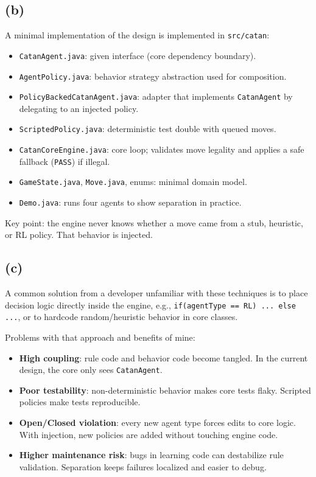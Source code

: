 \subsection{(b)}
A minimal implementation of the design is implemented in \texttt{src/catan}:
\begin{itemize}
    \item \texttt{CatanAgent.java}: given interface (core dependency boundary).
    \item \texttt{AgentPolicy.java}: behavior strategy abstraction used for composition.
    \item \texttt{PolicyBackedCatanAgent.java}: adapter that implements \texttt{CatanAgent} by delegating to an injected policy.
    \item \texttt{ScriptedPolicy.java}: deterministic test double with queued moves.
    \item \texttt{CatanCoreEngine.java}: core loop; validates move legality and applies a safe fallback (\texttt{PASS}) if illegal.
    \item \texttt{GameState.java}, \texttt{Move.java}, enums: minimal domain model.
    \item \texttt{Demo.java}: runs four agents to show separation in practice.
\end{itemize}

Key point: the engine never knows whether a move came from a stub, heuristic, or RL policy. That behavior is injected.

\subsection{(c)}
A common solution from a developer unfamiliar with these techniques is to place decision logic directly inside the engine, e.g., \texttt{if(agentType == RL) ... else ...}, or to hardcode random/heuristic behavior in core classes.

Problems with that approach and benefits of mine:
\begin{itemize}
    \item \textbf{High coupling}: rule code and behavior code become tangled. In the current design, the core only sees \texttt{CatanAgent}.
    \item \textbf{Poor testability}: non-deterministic behavior makes core tests flaky. Scripted policies make tests reproducible.
    \item \textbf{Open/Closed violation}: every new agent type forces edits to core logic. With injection, new policies are added without touching engine code.
    \item \textbf{Higher maintenance risk}: bugs in learning code can destabilize rule validation. Separation keeps failures localized and easier to debug.
\end{itemize}

